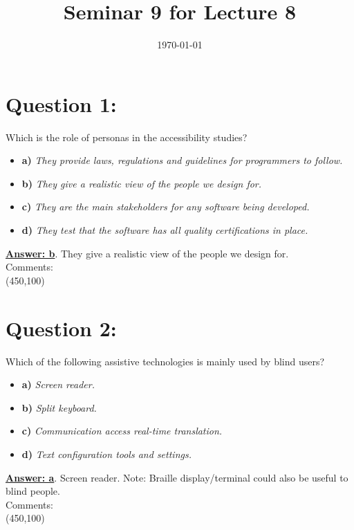 \documentclass[12pt,a4paper,norsk]{article}
\title{Seminar 9 for Lecture 8}
\author{ }
\date{\today}
\begin{document}
\maketitle
\section{Question 1:}
Which is the role of personas in the accessibility studies?

\begin{itemize}
 \item \textbf{a)} \textit{They provide laws, regulations and guidelines for programmers to follow.}
 \item \textbf{b)} \textit{They give a realistic view of the people we design for.}
 \item \textbf{c)} \textit{They are the main stakeholders for any software being developed.}
 \item \textbf{d)} \textit{They test that the software has all quality certifications in place.}
\end{itemize}


\underline{\textbf{Answer: b}}. They give a realistic view of the people we design for.\\


\noindent Comments:\\
\framebox(450,100){}\\

\section{Question 2:} Which of the following assistive technologies is mainly used by blind users? \\

\begin{itemize}
 \item \textbf{a)} \textit{Screen reader.}
 \item \textbf{b)} \textit{Split keyboard.}
 \item \textbf{c)} \textit{Communication access real-time translation.}
 \item \textbf{d)} \textit{Text configuration tools and settings.}
\end{itemize}

\underline{\textbf{Answer: a}}. Screen reader. Note: Braille display/terminal could also be useful to blind people. \\


\noindent Comments:\\
\framebox(450,100){}\\
\end{document}
